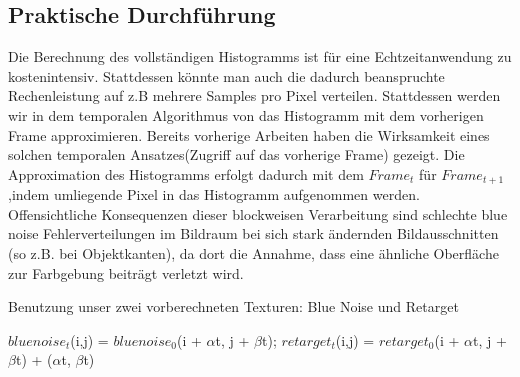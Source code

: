 \subsection{Praktische Durchführung}
Die Berechnung des vollständigen Histogramms ist für eine Echtzeitanwendung
zu kostenintensiv. Stattdessen könnte man auch die dadurch beanspruchte 
Rechenleistung auf z.B mehrere Samples pro Pixel verteilen.
Stattdessen werden wir in dem temporalen Algorithmus von \cite{hal02158423}
das Histogramm mit dem vorherigen Frame approximieren. 
Bereits vorherige Arbeiten \cite{Schied:2018:GER:3273023.3233301} haben die 
Wirksamkeit eines solchen temporalen Ansatzes(Zugriff auf das vorherige Frame)
gezeigt. Die Approximation des Histogramms erfolgt dadurch mit dem $Frame_{t}$ 
für $Frame_{t+1}$,indem umliegende Pixel in das Histogramm aufgenommen werden.
Offensichtliche Konsequenzen dieser blockweisen Verarbeitung sind schlechte blue noise 
Fehlerverteilungen im Bildraum bei sich stark ändernden Bildausschnitten
(so z.B. bei Objektkanten), da dort die Annahme, dass eine ähnliche Oberfläche
zur Farbgebung beiträgt verletzt wird.

\begin{algorithm}[H]
    \caption{Benutzung unser zwei vorberechneten Texturen: Blue Noise und Retarget}
    \begin{algorithmic}[1]
        \State $bluenoise_{t}$(i,j) = $bluenoise_{0}$(i + $\alpha$t, j + $\beta$t); 
        \State $retarget_{t}$(i,j) = $retarget_{0}$(i + $\alpha$t, j + $\beta$t) + ($\alpha$t, $\beta$t)
    \end{algorithmic}
    \label{alg:Benutzung vorberechneter Texturen}
\end{algorithm}